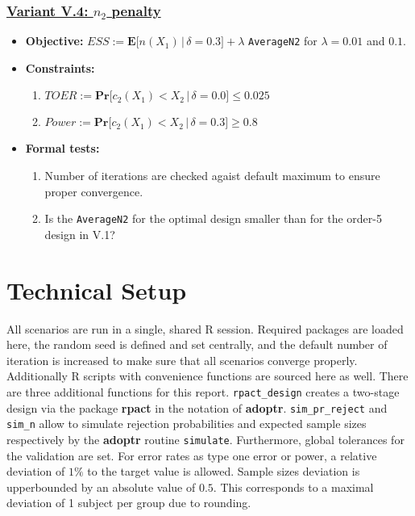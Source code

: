 \documentclass[]{book}
\providecommand{\tightlist}{%
  \setlength{\itemsep}{0pt}\setlength{\parskip}{0pt}}
\begin{document}
\hypertarget{variant-v.4-n_2-penalty}{%
\subsubsection{\texorpdfstring{\protect\hyperlink{variantV_4}{Variant V.4: \(n_2\) penalty}}{Variant V.4: n\_2 penalty}}\label{variant-v.4-n_2-penalty}}

\begin{itemize}
\tightlist
\item
  \textbf{Objective:} \(ESS := \boldsymbol{E}\big[n(X_1)\,|\,\delta=0.3\big] + \lambda\) \texttt{AverageN2}
  for \(\lambda = 0.01\) and \(0.1\).
\item
  \textbf{Constraints:}

  \begin{enumerate}
  \def\labelenumi{\arabic{enumi}.}
  \tightlist
  \item
    \(TOER := \boldsymbol{Pr}\big[c_2(X_1) < X_2\,|\,\delta=0.0\big] \leq 0.025\)
  \item
    \(Power := \boldsymbol{Pr}\big[c_2(X_1) < X_2\,|\,\delta=0.3\big] \geq 0.8\)
  \end{enumerate}
\item
  \textbf{Formal tests:}

  \begin{enumerate}
  \def\labelenumi{\arabic{enumi}.}
  \tightlist
  \item
    Number of iterations are checked agaist default maximum to ensure proper
    convergence.
  \item
    Is the \texttt{AverageN2} for the optimal design smaller than for the order-5
    design in V.1?
  \end{enumerate}
\end{itemize}

\hypertarget{technical-setup}{%
\section{Technical Setup}\label{technical-setup}}

All scenarios are run in a single, shared R session.
Required packages are loaded here,
the random seed is defined and set centrally, and the default number
of iteration is increased to make sure that all scenarios
converge properly.
Additionally R scripts with convenience functions are sourced here as well.
There are three additional functions for this report.
\texttt{rpact\_design} creates a two-stage design via the package \textbf{rpact} \citep{R-rpact}
in the notation of \textbf{adoptr}.
\texttt{sim\_pr\_reject} and \texttt{sim\_n} allow to simulate rejection probabilities
and expected sample sizes respectively by the \textbf{adoptr} routine \texttt{simulate}.
Furthermore, global tolerances for the validation are set.
For error rates as type one error or power, a relative deviation of \(1\%\) to
the target value is allowed.
Sample sizes deviation is upperbounded by an absolute value of \(0.5\).
This corresponds to a maximal deviation of 1 subject per group due to rounding.
\end{document}
